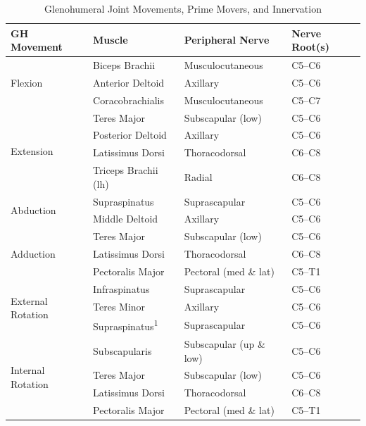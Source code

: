 \begin{table}[H]
\centering
\caption{Glenohumeral Joint Movements, Prime Movers, and Innervation}
\begin{tabular}{|p{4cm}|p{4.5cm}|p{4cm}|p{2.5cm}|}
\hline
\textbf{GH Movement} & \textbf{Muscle} & \textbf{Peripheral Nerve} & \textbf{Nerve Root(s)} \\
\hline
\multirow{3}{*}{Flexion}
  & Biceps Brachii & Musculocutaneous & C5–C6 \\
  & Anterior Deltoid & Axillary & C5–C6 \\
  & Coracobrachialis & Musculocutaneous & C5–C7 \\
\hline
\multirow{4}{*}{Extension}
  & Teres Major & Subscapular (low) & C5–C6 \\
  & Posterior Deltoid & Axillary & C5–C6 \\
  & Latissimus Dorsi & Thoracodorsal & C6–C8 \\
  & Triceps Brachii (lh) & Radial & C6–C8 \\
\hline
\multirow{2}{*}{Abduction}
  & Supraspinatus & Suprascapular & C5–C6 \\
  & Middle Deltoid & Axillary & C5–C6 \\
\hline
\multirow{3}{*}{Adduction}
  & Teres Major & Subscapular (low) & C5–C6 \\
  & Latissimus Dorsi & Thoracodorsal & C6–C8 \\
  & Pectoralis Major & Pectoral (med \& lat) & C5–T1 \\
\hline
\multirow{3}{*}{External Rotation}
  & Infraspinatus & Suprascapular & C5–C6 \\
  & Teres Minor & Axillary & C5–C6 \\
  & Supraspinatus\textsuperscript{1} & Suprascapular & C5–C6 \\
\hline
\multirow{4}{*}{Internal Rotation}
  & Subscapularis & Subscapular (up \& low) & C5–C6 \\
  & Teres Major & Subscapular (low) & C5–C6 \\
  & Latissimus Dorsi & Thoracodorsal & C6–C8 \\
  & Pectoralis Major & Pectoral (med \& lat) & C5–T1 \\
\hline
\end{tabular}
\end{table}


